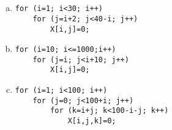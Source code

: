 \documentclass[11pt]{article}
\begin{document}
\section{}
\begin{enumerate}[a)]
\item
\begin{verbatim}
for (i=1; i<30; i++)
    for (j=i+2; j<40-i; j++)
        X[i,j]=0;
\end{verbatim}

\item
\begin{verbatim}
for (i=10; i<=1000;i++) 
    for (j=i; j<i+10; j++)
        X[i,j]=0;
\end{verbatim}

\item
\begin{verbatim}
for (i=1; i<100; i++)
    for (j=0; j<100+i; j++)
        for (k=i+j; k<100-i-j; k++) 
            X[i,j,k]=0;
\end{verbatim}

\end{enumerate}
\end{document}
